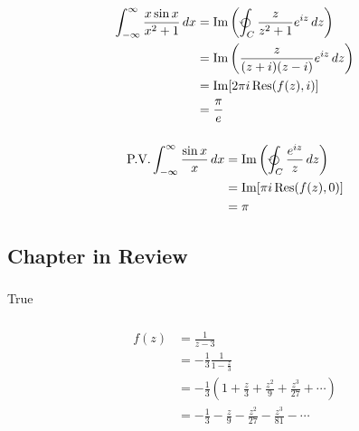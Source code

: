 \documentclass{article}
\renewcommand{\Im}{\operatorname{Im}}
\newcommand{\Res}{\operatorname{Res}}
\begin{document}
\setcounter{subsubsection}{22}
\subsubsection{}

\begin{align*}
  \int_{-\infty}^\infty \frac{x \sin x}{x^2 + 1} \,d x & = \Im \left( \varointctrclockwise_C \frac{z}{z^2 + 1} e^{i z} \,d z \right) \\
                                                       & = \Im \left( \frac{z}{(z + i) (z - i)} e^{i z} \,d z \right)                \\
                                                       & = \Im [2 \pi i \Res(f(z), i)]                                               \\
                                                       & = \frac{\pi}{e}
\end{align*}

\setcounter{subsubsection}{30}
\subsubsection{}

\begin{align*}
  \text{P.V.} \int_{-\infty}^\infty \frac{\sin x}{x} \,d x & = \Im \left( \varointctrclockwise_C \frac{e^{i z}}{z} \,d z \right) \\
                                                           & = \Im [\pi i \Res(f(z), 0)]                                         \\
                                                           & = \pi
\end{align*}

\subsection{Chapter in Review}

\subsubsection{}

True

\setcounter{subsubsection}{2}
\subsubsection{}

\begin{align*}
  f(z) & = \frac{1}{z - 3}                                                                       \\
       & = -\frac{1}{3} \frac{1}{1 - \frac{z}{3}}                                                \\
       & = -\frac{1}{3} \left( 1 + \frac{z}{3} + \frac{z^2}{9} + \frac{z^3}{27} + \cdots \right) \\
       & = -\frac{1}{3} - \frac{z}{9} - \frac{z^2}{27} - \frac{z^3}{81} - \cdots
\end{align*}
\end{document}
